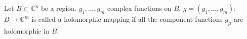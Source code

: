 Let $B \subset \mathbb{C}^n$ be a region, $g_1, \ldots, g_m$ complex functions on $B$. $g = (g_1, \ldots, g_m)$: $B \to \mathbb{C}^m$ is called a holomorphic mapping if all the component functions $g_\mu$ are holomorphic in $B$.
